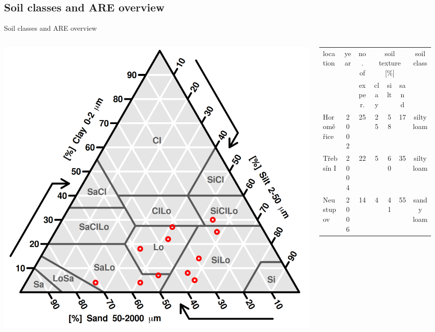 \subsection{Soil classes and ARE overview}
\begin{block}{Soil classes and ARE overview}

\begin{columns}
    \begin{column}{0.4\textwidth}
        \includegraphics[width=1.1\textwidth]{obr/soil_triangle.png}
    \end{column}
    \begin{column}{0.6\textwidth}
        \begin{table}[]
        \begin{tabular}{lcccccc}
        \hline
        \hline
        location      & year    & no. of            & \multicolumn{3}{c}{soil texture {[}\%{]}}  & soil class      \\
                    &         & exper.       & clay  & silt  & sand &  \\
        \hline
        Horoměřice    & 2002    & 25                & 25             & 58            & 17            & silty loam      \\
        Třebsín I     & 2004    & 22                & 5              & 60            & 35            & silty loam      \\
        Neustupov     & 2006    & 14                & 4              & 41            & 55            & sandy loam      \\

\end{tabular}
\end{table}
\end{column}
\end{columns}
\end{block}
